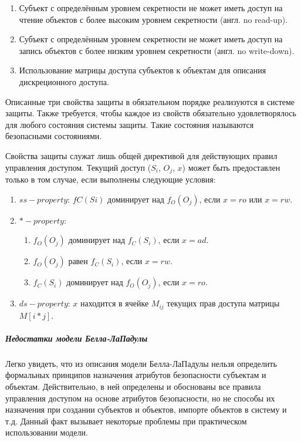 \begin{enumerate}
    \item Субъект с определённым уровнем секретности не может иметь доступ на чтение объектов с более высоким уровнем секретности (англ. no read-up).
    \item Субъект с определённым уровнем секретности не может иметь доступ на запись объектов с более низким уровнем секретности (англ. no write-down).
    \item Использование матрицы доступа субъектов к объектам для описания дискреционного доступа.
\end{enumerate}

Описанные три свойства защиты в обязательном порядке реализуются в системе защиты. Также требуется, чтобы каждое из свойств обязательно удовлетворялось для любого состояния системы защиты. Такие состояния называются безопасными состояниями. 

Свойства защиты служат лишь общей директивой для действующих правил управления доступом. Текущий доступ ($S_i$, $O_j$, $x$) может быть предоставлен только в том случае, если выполнены следующие условия: 

\begin{enumerate}
	\item $ss-property$: $fC(Si)$ доминирует над $f_O(O_j)$, если $x = ro$ или $x = rw$.
	\item $*-property$:
	\begin{enumerate}
		\item $f_O (O_j)$ доминирует над $f_C(S_i)$, если $x = ad$.
		\item $f_O(O_j)$ равен $f_C(S_i)$, если $x = rw$.
		\item $f_C(S_i)$ доминирует над $f_O(O_j)$, если $x = ro$.
	\end{enumerate}
	\item $ds-property$: $x$ находится в ячейке $M_{ij}$ текущих прав доступа матрицы $M[i*j]$. 
\end{enumerate}

\subparagraph{Недостатки модели Белла-ЛаПадулы}

Легко увидеть, что из описания модели Белла-ЛаПадулы нельзя определить формальных принципов назначения атрибутов безопасности субъектам и объектам. Действительно, в ней определены и обоснованы все правила управления доступом на основе атрибутов безопасности, но не способы их назначения при создании субъектов и объектов, импорте объектов в систему и т.д. Данный факт вызывает некоторые проблемы при практическом использовании модели. 

